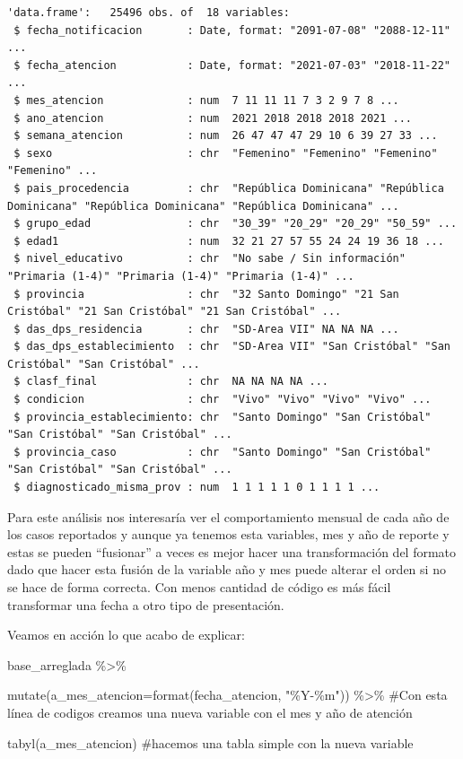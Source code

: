 \documentclass[
  letterpaper,
  DIV=11,
  numbers=noendperiod]{scrreprt}
\newenvironment{Shaded}{\begin{snugshade}}{\end{snugshade}}
\newcommand{\AttributeTok}[1]{\textcolor[rgb]{0.40,0.45,0.13}{#1}}
\newcommand{\CommentTok}[1]{\textcolor[rgb]{0.37,0.37,0.37}{#1}}
\newcommand{\FunctionTok}[1]{\textcolor[rgb]{0.28,0.35,0.67}{#1}}
\newcommand{\NormalTok}[1]{\textcolor[rgb]{0.00,0.23,0.31}{#1}}
\newcommand{\SpecialCharTok}[1]{\textcolor[rgb]{0.37,0.37,0.37}{#1}}
\newcommand{\StringTok}[1]{\textcolor[rgb]{0.13,0.47,0.30}{#1}}
\begin{document}
\begin{verbatim}
'data.frame':   25496 obs. of  18 variables:
 $ fecha_notificacion       : Date, format: "2091-07-08" "2088-12-11" ...
 $ fecha_atencion           : Date, format: "2021-07-03" "2018-11-22" ...
 $ mes_atencion             : num  7 11 11 11 7 3 2 9 7 8 ...
 $ ano_atencion             : num  2021 2018 2018 2018 2021 ...
 $ semana_atencion          : num  26 47 47 47 29 10 6 39 27 33 ...
 $ sexo                     : chr  "Femenino" "Femenino" "Femenino" "Femenino" ...
 $ pais_procedencia         : chr  "República Dominicana" "República Dominicana" "República Dominicana" "República Dominicana" ...
 $ grupo_edad               : chr  "30_39" "20_29" "20_29" "50_59" ...
 $ edad1                    : num  32 21 27 57 55 24 24 19 36 18 ...
 $ nivel_educativo          : chr  "No sabe / Sin información" "Primaria (1-4)" "Primaria (1-4)" "Primaria (1-4)" ...
 $ provincia                : chr  "32 Santo Domingo" "21 San Cristóbal" "21 San Cristóbal" "21 San Cristóbal" ...
 $ das_dps_residencia       : chr  "SD-Area VII" NA NA NA ...
 $ das_dps_establecimiento  : chr  "SD-Area VII" "San Cristóbal" "San Cristóbal" "San Cristóbal" ...
 $ clasf_final              : chr  NA NA NA NA ...
 $ condicion                : chr  "Vivo" "Vivo" "Vivo" "Vivo" ...
 $ provincia_establecimiento: chr  "Santo Domingo" "San Cristóbal" "San Cristóbal" "San Cristóbal" ...
 $ provincia_caso           : chr  "Santo Domingo" "San Cristóbal" "San Cristóbal" "San Cristóbal" ...
 $ diagnosticado_misma_prov : num  1 1 1 1 1 0 1 1 1 1 ...
\end{verbatim}

Para este análisis nos interesaría ver el comportamiento mensual de cada
año de los casos reportados y aunque ya tenemos esta variables, mes y
año de reporte y estas se pueden ``fusionar'' a veces es mejor hacer una
transformación del formato dado que hacer esta fusión de la variable año
y mes puede alterar el orden si no se hace de forma correcta. Con menos
cantidad de código es más fácil transformar una fecha a otro tipo de
presentación.

Veamos en acción lo que acabo de explicar:

\begin{Shaded}
\begin{Highlighting}[]
\NormalTok{base\_arreglada }\SpecialCharTok{\%\textgreater{}\%} 
  
  \FunctionTok{mutate}\NormalTok{(}\AttributeTok{a\_mes\_atencion=}\FunctionTok{format}\NormalTok{(fecha\_atencion, }\StringTok{"\%Y{-}\%m"}\NormalTok{)) }\SpecialCharTok{\%\textgreater{}\%} \CommentTok{\#Con esta línea de codigos creamos una nueva variable con el mes y año de atención}
  
  \FunctionTok{tabyl}\NormalTok{(a\_mes\_atencion) }\CommentTok{\#hacemos una tabla simple con la nueva variable}
\end{Highlighting}
\end{Shaded}
\end{document}
